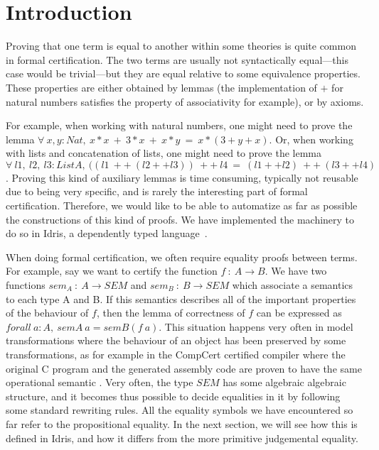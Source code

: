 \section{Introduction}

Proving that one term is equal to another within some theories is quite common
in formal certification. The two terms are usually not syntactically 
equal---this case would be trivial---but they are equal relative to some
equivalence properties. These properties are either obtained by lemmas
(the implementation of $+$ for natural numbers satisfies the property of
associativity for example), or by axioms.

For example, when working with natural numbers, one might need to prove the
lemma $\forall\ x, y:Nat,\ x*x\ +\ 3*x\ +\ x*y\ =\ x*(3+y+x)$. Or,
when working
with lists and concatenation of lists, one might need to prove the lemma
$\forall\ l1,\ l2,\ l3:List A,\ ((l1\ ++\ (l2 ++ l3))\ ++\ l4\ =\ (l1++l2)\ ++\
(l3++l4)$. Proving this kind of auxiliary lemmas is time consuming,
typically not reusable due to being very specific, and is rarely
the interesting part of formal
certification. Therefore, we would like to be able to automatize as far as
possible the constructions of this kind of proofs. We have implemented
the machinery to do so in Idris, a
dependently typed language~\cite{brady2013idris}.

When doing formal certification, we often require equality proofs between
terms.
For example, say we want to certify the function $f\ :\ A \rightarrow
B$. We have two functions $sem_A\ :\ A \rightarrow SEM$ and $sem_B\ : \ B
\rightarrow SEM$ which associate a semantics to each type A
and B. If this semantics describes all of the important properties of
the behaviour of $f$,
then the lemma of correctness of $f$ can be expressed as $forall\ a:A,\ semA\ a =
semB (f\ a)$. This situation happens very often in model transformations where the behaviour of an object has been preserved by some transformations, as for example in the CompCert certified compiler where the original C program and the generated assembly code are proven to have the same operational semantic \cite{Leroy09}.
Very often, the type $SEM$ has some algebraic
algebraic structure, and it becomes thus possible to
decide equalities in it by following some standard rewriting rules.  
All the equality symbols we have
encountered so far refer to the propositional equality. In the next section,
we will see how this is defined in Idris, and how it differs from the more
primitive judgemental equality.

